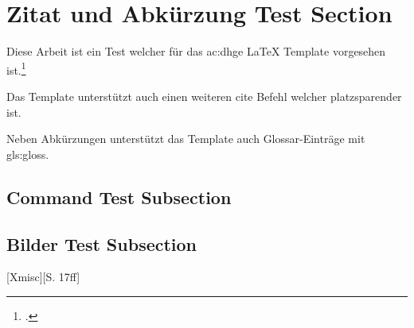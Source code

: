 \section{Zitat und Abkürzung Test Section}

Diese Arbeit ist ein Test welcher f\"ur das \gls{ac:dhge} LaTeX Template vorgesehen ist.\footcite{Xmisc}

Das Template unterstützt auch einen weiteren cite Befehl welcher platzsparender ist.\supercite{Xmisc}

Neben Abkürzungen unterstützt das Template auch Glossar-Einträge mit \gls{gls:gloss}.

\cleardoublepage

\subsection{Command Test Subsection}

\doubleunderline{$150\mathrm{\Omega}$}

\subsection{Bilder Test Subsection}

[Xmisc][S. 17ff]
